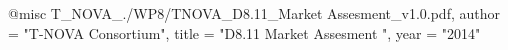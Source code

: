 @misc{ T_NOVA_./WP8/TNOVA_D8.11_Market Assesment_v1.0.pdf,
       author = "{T-NOVA Consortium}",
       title = "D8.11 Market Assesment ",
       year = "2014" }
